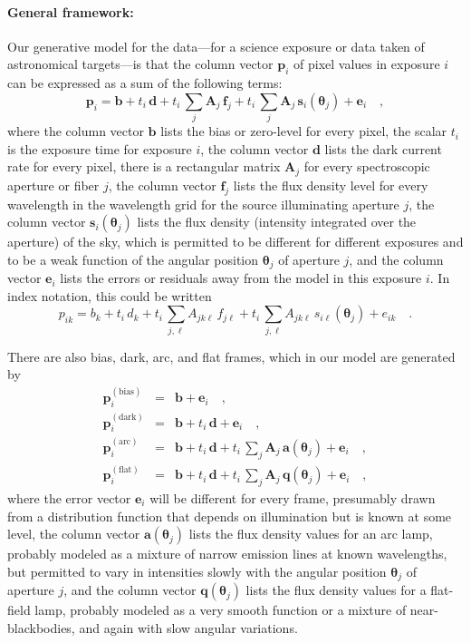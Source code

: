 \documentclass[12pt]{article}
\newcommand{\hmatrix}[1]{\boldsymbol{#1}}
\newcommand{\Amatrix}{\hmatrix{A}}
\newcommand{\pixels}{\hmatrix{p}}
\newcommand{\biaspixels}{\hmatrix{p}^\mathrm{(bias)}}
\newcommand{\darkpixels}{\hmatrix{p}^\mathrm{(dark)}}
\newcommand{\arcpixels}{\hmatrix{p}^\mathrm{(arc)}}
\newcommand{\flatpixels}{\hmatrix{p}^\mathrm{(flat)}}
\newcommand{\bias}{\hmatrix{b}}
\newcommand{\dark}{\hmatrix{d}}
\newcommand{\flux}{\hmatrix{f}}
\newcommand{\sky}{\hmatrix{s}}
\newcommand{\arc}{\hmatrix{a}}
\newcommand{\lamp}{\hmatrix{q}}
\renewcommand{\angle}{\hmatrix{\theta}}
\newcommand{\error}{\hmatrix{e}}
\newcommand{\exptime}{t}
\begin{document}
\paragraph{General framework:}
Our generative model for the data---for a science exposure or data
taken of astronomical targets---is that the column vector $\pixels_i$
of pixel values in exposure $i$ can be expressed as a sum of the
following terms:
\begin{equation}
\pixels_i = \bias + \exptime_i\,\dark
          + \exptime_i\,\sum_j \Amatrix_j\,\flux_j
          + \exptime_i\,\sum_j \Amatrix_j\,\sky_i(\angle_j)
          + \error_i \quad ,
\end{equation}
where the column vector $\bias$ lists the bias or zero-level for every
pixel, the scalar $\exptime_i$ is the exposure time for exposure $i$,
the column vector $\dark$ lists the dark current rate for every pixel,
there is a rectangular matrix $\Amatrix_j$ for every spectroscopic
aperture or fiber $j$, the column vector $\flux_j$ lists the flux
density level for every wavelength in the wavelength grid for the
source illuminating aperture $j$, the column vector $\sky_i(\angle_j)$
lists the flux density (intensity integrated over the aperture) of the
sky, which is permitted to be different for different exposures and to
be a weak function of the angular position $\angle_j$ of aperture $j$,
and the column vector $\error_i$ lists the errors or residuals away
from the model in this exposure $i$.  In index notation, this could be
written
\begin{equation}
p_{ik} = b_k + \exptime_i\,d_k
       + \exptime_i\,\sum_{j,\ell} A_{jk\ell}\,f_{j\ell}
       + \exptime_i\,\sum_{j,\ell} A_{jk\ell}\,s_{i\ell}(\angle_j)
       + e_{ik} \quad .
\end{equation}

There are also bias, dark, arc, and flat frames, which in our model
are generated by
\begin{eqnarray}\displaystyle
\biaspixels_i & = & \bias 
                + \error_i \quad ,\\
\darkpixels_i & = & \bias + \exptime_i\,\dark
                + \error_i \quad ,\\
\arcpixels_i  & = & \bias + \exptime_i\,\dark
                + \exptime_i\,\sum_j \Amatrix_j\,\arc(\angle_j)
                + \error_i \quad ,\\
\flatpixels_i & = & \bias + \exptime_i\,\dark
                + \exptime_i\,\sum_j \Amatrix_j\,\lamp(\angle_j)
                + \error_i \quad ,
\end{eqnarray}
where the error vector $\error_i$ will be different for every frame,
presumably drawn from a distribution function that depends on
illumination but is known at some level, the column vector
$\arc(\angle_j)$ lists the flux density values for an arc lamp,
probably modeled as a mixture of narrow emission lines at known
wavelengths, but permitted to vary in intensities slowly with the
angular position $\angle_j$ of aperture $j$, and the column vector
$\lamp(\angle_j)$ lists the flux density values for a flat-field lamp,
probably modeled as a very smooth function or a mixture of
near-blackbodies, and again with slow angular variations.
\end{document}
